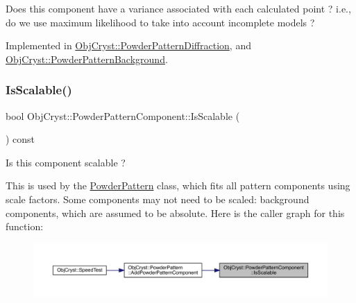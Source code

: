 Does this component have a variance associated with each calculated point ? i.\+e., do we use maximum likelihood to take into account incomplete models ? 

Implemented in \mbox{\hyperlink{class_obj_cryst_1_1_powder_pattern_diffraction_a70c5f1b70bbe4ace8ee26120d5f85fd1}{Obj\+Cryst\+::\+Powder\+Pattern\+Diffraction}}, and \mbox{\hyperlink{class_obj_cryst_1_1_powder_pattern_background_a126f036fe66797c52c7e362663925ad9}{Obj\+Cryst\+::\+Powder\+Pattern\+Background}}.

\mbox{\label{class_obj_cryst_1_1_powder_pattern_component_a28b3e3cbbd4bc064893e8407b922bc6c}} 
\subsubsection{\texorpdfstring{IsScalable()}{IsScalable()}}
{\footnotesize\ttfamily bool Obj\+Cryst\+::\+Powder\+Pattern\+Component\+::\+Is\+Scalable (\begin{DoxyParamCaption}{ }\end{DoxyParamCaption}) const}



Is this component scalable ? 

This is used by the \mbox{\hyperlink{class_obj_cryst_1_1_powder_pattern}{Powder\+Pattern}} class, which fits all pattern components using scale factors. Some components may not need to be scaled\+: background components, which are assumed to be absolute. Here is the caller graph for this function\+:
\nopagebreak
\begin{figure}[H]
\begin{center}
\leavevmode
\includegraphics[width=350pt]{class_obj_cryst_1_1_powder_pattern_component_a28b3e3cbbd4bc064893e8407b922bc6c_icgraph}
\end{center}
\end{figure}
\mbox{\label{class_obj_cryst_1_1_powder_pattern_component_a4731b5a64ee9aab6779e2ef323242fe5}} 
